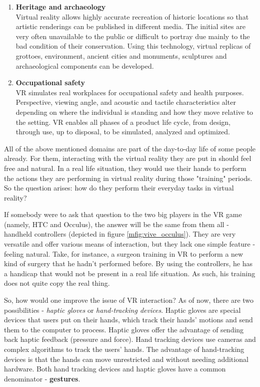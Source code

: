 \documentclass[12pt,a4paper,twoside]{report}
\begin{document}
\begin{enumerate}
  \item \textbf{Heritage and archaeology} \\
    Virtual reality allows highly accurate recreation of historic locations so that artistic renderings can be published in different media. The initial sites are very often unavailable to the public or difficult to portray due mainly to the bad condition of their conservation. Using this technology, virtual replicas of grottoes, environment, ancient cities and monuments, sculptures and archaeological components can be developed.

  \item \textbf{Occupational safety} \\
    VR simulates real workplaces for occupational safety and health purposes. Perspective, viewing angle, and acoustic and tactile characteristics alter depending on where the individual is standing and how they move relative to the setting. VR enables all phases of a product life cycle, from design, through use, up to disposal, to be simulated, analyzed and optimized. 
\end{enumerate}

All of the above mentioned domains are part of the day-to-day life of some people already. For them, interacting with the virtual reality they are put in should feel free and natural. In a real life situation, they would use their hands to perform the actions they are performing in virtual reality during those "training" periods. So the question arises: how do they perform their everyday tasks in virtual reality?

If somebody were to ask that question to the two big players in the VR game (namely, HTC and Occulus), the answer will be the same from them all - handheld controllers (depicted in figure \ref{mfig:vive_occulus}). They are very versatile and offer various means of interaction, but they lack one simple feature - feeling natural. Take, for instance, a surgeon training in VR to perform a new kind of surgery that he hadn't performed before. By using the controllers, he has a handicap that would not be present in a real life situation. As such, his training does not quite copy the real thing.

So, how would one improve the issue of VR interaction? As of now, there are two possibilities - \textit{haptic gloves} or \textit{hand-tracking devices}. Haptic gloves are special devices that users put on their hands, which track their hands' motions and send them to the computer to process. Haptic gloves offer the advantage of sending back haptic feedback (pressure and force). Hand tracking devices use cameras and complex algorithms to track the users' hands. The advantage of hand-tracking devices is that the hands can move unrestricted and without needing additional hardware. Both hand tracking devices and haptic gloves have a common denominator - \textbf{gestures}.
\end{document}
